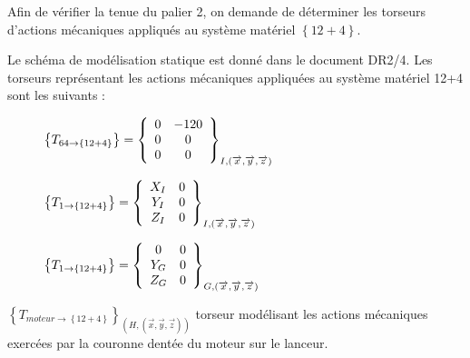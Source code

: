 Afin de vérifier la tenue du palier 2, on demande de déterminer les torseurs d'actions mécaniques appliqués au système matériel $\left\{12+4\right\}$.

\newpage

Le schéma de modélisation statique est donné dans le document DR2/4. Les torseurs représentant les actions mécaniques appliquées au système matériel {12+4} sont les suivants :

\begin{figure}[!h]
  \begin{minipage}{0.48\linewidth}
  \begin{math}
  \left\{T_{64 \rightarrow \left\{12+4\right\}}\right\}=\left\{
  \begin{array}{c c}
  0 & -120 \\
  0 & 0 \\
  0 & 0
  \end{array}\right\}_{I,(\overrightarrow{x},\overrightarrow{y},\overrightarrow{z})}
  \end{math}
  \end{minipage}
  \hfill
  \begin{minipage}{0.48\linewidth}
  \begin{math}
  \left\{T_{1 \rightarrow \left\{12+4\right\}}\right\}=\left\{
  \begin{array}{c c}
  X_I & 0 \\
  Y_I & 0 \\
  Z_I & 0
  \end{array}\right\}_{I,(\overrightarrow{x},\overrightarrow{y},\overrightarrow{z})}
  \end{math}
\end{minipage}
\end{figure}

\begin{figure}[!h]
\begin{math}
  \left\{T_{1 \rightarrow \left\{12+4\right\}}\right\}=\left\{
  \begin{array}{c c}
  0 & 0 \\
  Y_G & 0 \\
  Z_G & 0
  \end{array}\right\}_{G,(\overrightarrow{x},\overrightarrow{y},\overrightarrow{z})}
\end{math}
\end{figure}

$\left\{T_{moteur \rightarrow \left\{12+4\right\}}\right\}_{(H,(\overrightarrow{x},\overrightarrow{y},\overrightarrow{z}))}$ torseur modélisant les actions mécaniques exercées par la couronne dentée du moteur sur le lanceur.

